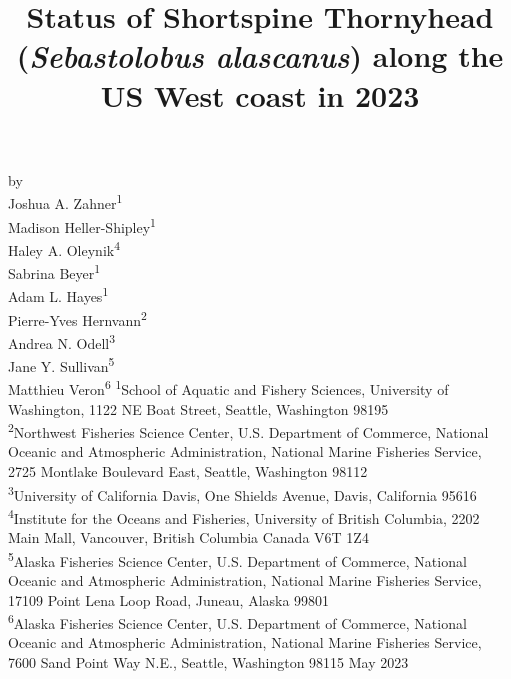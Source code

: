 \documentclass[11pt,
  english,
  letterpaper,
]{article}
\date{}
\newcommand{\trTitle}{Status of Shortspine Thornyhead (\emph{Sebastolobus alascanus}) along the US West coast in 2023}
\newcommand{\trYear}{2023}
\newcommand{\trMonth}{May}
\begin{document}

\renewcommand*{\thefootnote}{\fnsymbol{footnote}}

\small
\thispagestyle{empty}
\noindent
\begin{center}
\title{Status of Shortspine Thornyhead (\emph{Sebastolobus alascanus}) along the US West coast in 2023}
\vspace{1.5cm}
{\Large\textbf{}}
\vfill
by\\
Joshua A. Zahner\textsuperscript{1}\\
Madison Heller-Shipley\textsuperscript{1}\\
Haley A. Oleynik\textsuperscript{4}\\
Sabrina Beyer\textsuperscript{1}\\
Adam L. Hayes\textsuperscript{1}\\
Pierre-Yves Hernvann\textsuperscript{2}\\
Andrea N. Odell\textsuperscript{3}\\
Jane Y. Sullivan\textsuperscript{5}\\
Matthieu Veron\textsuperscript{6}\vfill
\textsuperscript{1}School of Aquatic and Fishery Sciences, University of Washington, 1122 NE Boat Street, Seattle, Washington 98195\\
\textsuperscript{2}Northwest Fisheries Science Center, U.S. Department of Commerce, National Oceanic and Atmospheric Administration, National Marine Fisheries Service, 2725 Montlake Boulevard East, Seattle, Washington 98112\\
\textsuperscript{3}University of California Davis, One Shields Avenue, Davis, California 95616\\
\textsuperscript{4}Institute for the Oceans and Fisheries, University of British Columbia, 2202 Main Mall, Vancouver, British Columbia Canada V6T 1Z4\\
\textsuperscript{5}Alaska Fisheries Science Center, U.S. Department of Commerce, National Oceanic and Atmospheric Administration, National Marine Fisheries Service, 17109 Point Lena Loop Road, Juneau, Alaska 99801\\
\textsuperscript{6}Alaska Fisheries Science Center, U.S. Department of Commerce, National Oceanic and Atmospheric Administration, National Marine Fisheries Service, 7600 Sand Point Way N.E., Seattle, Washington 98115\vfill
\trMonth{} \trYear{}
\end{center}
\clearpage
\end{document}
